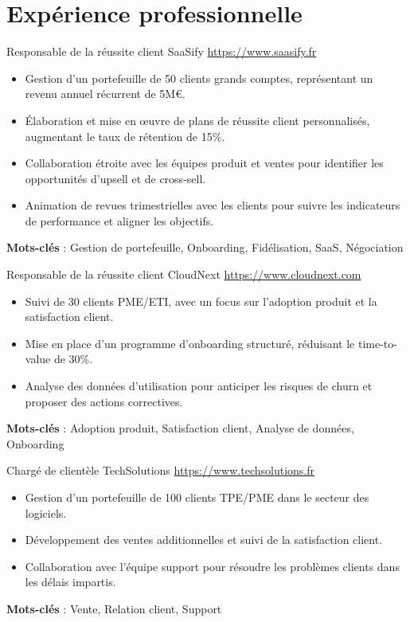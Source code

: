 \documentclass[a4paper, serif, 10pt]{moderncv}
\begin{document}
\section{Expérience professionnelle}

        {Responsable de la réussite client}
        {SaaSify}
        {\url{https://www.saasify.fr}}
        {}
        {\begin{itemize}
\item Gestion d'un portefeuille de 50 clients grands comptes, représentant un revenu annuel récurrent de 5M€.
\item Élaboration et mise en œuvre de plans de réussite client personnalisés, augmentant le taux de rétention de 15\%.
\item Collaboration étroite avec les équipes produit et ventes pour identifier les opportunités d'upsell et de cross-sell.
\item Animation de revues trimestrielles avec les clients pour suivre les indicateurs de performance et aligner les objectifs.
\end{itemize}
\textbf{Mots-clés} : Gestion de portefeuille, Onboarding, Fidélisation, SaaS, Négociation}

        {Responsable de la réussite client}
        {CloudNext}
        {\url{https://www.cloudnext.com}}
        {}
        {\begin{itemize}
\item Suivi de 30 clients PME/ETI, avec un focus sur l'adoption produit et la satisfaction client.
\item Mise en place d'un programme d'onboarding structuré, réduisant le time-to-value de 30\%.
\item Analyse des données d'utilisation pour anticiper les risques de churn et proposer des actions correctives.
\end{itemize}
\textbf{Mots-clés} : Adoption produit, Satisfaction client, Analyse de données, Onboarding}

        {Chargé de clientèle}
        {TechSolutions}
        {\url{https://www.techsolutions.fr}}
        {}
        {\begin{itemize}
\item Gestion d'un portefeuille de 100 clients TPE/PME dans le secteur des logiciels.
\item Développement des ventes additionnelles et suivi de la satisfaction client.
\item Collaboration avec l'équipe support pour résoudre les problèmes clients dans les délais impartis.
\end{itemize}
\textbf{Mots-clés} : Vente, Relation client, Support}
\end{document}
